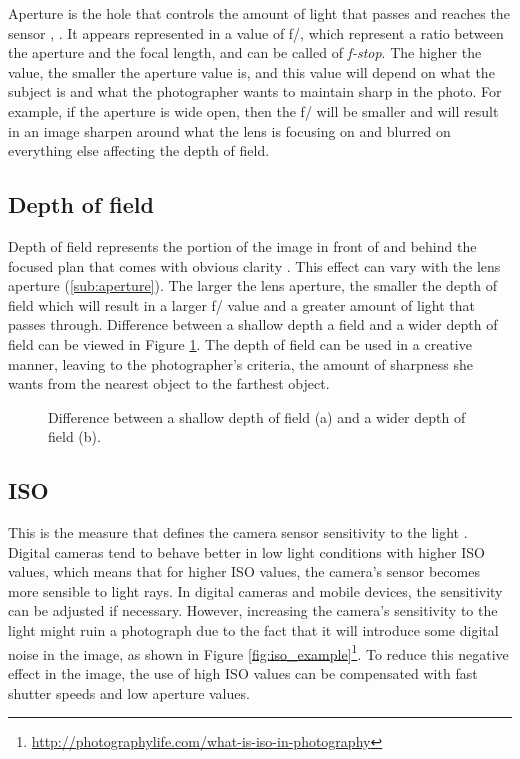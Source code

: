 Aperture is the hole that controls the amount of light that passes and reaches the sensor \cite{Kamps2012}, \cite{Santos}. It appears represented in a value of f/, which represent a ratio between the aperture and the focal length, and can be called of \emph{f-stop}. The higher the value, the smaller the aperture value is, and this value will depend on what the subject is and what the photographer wants to maintain sharp in the photo. For example, if the aperture is wide open, then the f/ will be smaller and will result in an image sharpen around what the lens is focusing on and blurred on everything else affecting the depth of field.

\subsection{Depth of field}
\label{sub:depth_field}

Depth of field represents the portion of the image in front of and behind the focused plan that comes with obvious clarity \cite{Kamps2012} \cite{Santos}. This effect can vary with the lens aperture (\ref{sub:aperture}). The larger the lens aperture, the smaller the depth of field which will result in a larger f/ value and a greater amount of light that passes through. Difference between a shallow depth a field and a wider depth of field can be viewed in Figure \ref{fig:depth_field_example}.
The depth of field can be used in a creative manner, leaving to the  photographer's criteria, the amount of sharpness she wants from the nearest object to the farthest object.

\begin{figure}[htbp]
        \centering
  \caption{Difference between a shallow depth of field (a) and a wider depth of field (b). \cite{Kamps2012}}
  \label{fig:depth_field_example}
\end{figure}

\subsection{ISO}
\label{sub:iso}

This is the measure that defines the camera sensor sensitivity to the light \cite{Kamps2012}. Digital cameras tend to behave better in low light conditions with higher ISO values, which means that for higher ISO values, the camera's sensor becomes more sensible to light rays.
In digital cameras and mobile devices, the sensitivity can be adjusted if necessary. However, increasing the camera's sensitivity to the light might ruin a photograph due to the fact that it will introduce some digital noise in the image, as shown in Figure \ref{fig:iso_example}\footnote{\url{http://photographylife.com/what-is-iso-in-photography}}. To reduce this negative effect in the image, the use of high ISO values can be compensated with fast shutter speeds and low aperture values.

